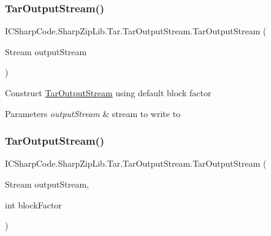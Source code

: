 \subsubsection{\texorpdfstring{Tar\+Output\+Stream()}{TarOutputStream()}\hspace{0.1cm}{\footnotesize\ttfamily [1/2]}}
{\footnotesize\ttfamily I\+C\+Sharp\+Code.\+Sharp\+Zip\+Lib.\+Tar.\+Tar\+Output\+Stream.\+Tar\+Output\+Stream (\begin{DoxyParamCaption}\item[{Stream}]{output\+Stream }\end{DoxyParamCaption})\hspace{0.3cm}{\ttfamily [inline]}}



Construct \hyperlink{class_i_c_sharp_code_1_1_sharp_zip_lib_1_1_tar_1_1_tar_output_stream}{Tar\+Output\+Stream} using default block factor 


\begin{DoxyParams}{Parameters}
{\em output\+Stream} & stream to write to\\
\hline
\end{DoxyParams}
\mbox{\label{class_i_c_sharp_code_1_1_sharp_zip_lib_1_1_tar_1_1_tar_output_stream_abb7670065482af0ce4f4be9c0d588a15}} 
\subsubsection{\texorpdfstring{Tar\+Output\+Stream()}{TarOutputStream()}\hspace{0.1cm}{\footnotesize\ttfamily [2/2]}}
{\footnotesize\ttfamily I\+C\+Sharp\+Code.\+Sharp\+Zip\+Lib.\+Tar.\+Tar\+Output\+Stream.\+Tar\+Output\+Stream (\begin{DoxyParamCaption}\item[{Stream}]{output\+Stream,  }\item[{int}]{block\+Factor }\end{DoxyParamCaption})\hspace{0.3cm}{\ttfamily [inline]}}



